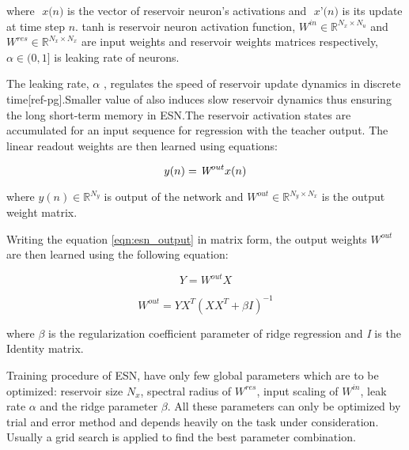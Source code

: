 where $\textit{ x(n)}$ is the vector of reservoir neuron's activations and $\textit{ x'(n)}$ is its update at time step $\textit{n}$. tanh is reservoir neuron activation function, $ W^{in} \in \mathbb{R}^{{N_x} \times{N_u}}$ and $ W^{res} \in \mathbb{R}^{{N_x} \times{N_x}} $ are input weights and reservoir weights matrices respectively, $\alpha \in (0,1]$ is leaking rate of neurons.  

The leaking rate, $\alpha$ , regulates the speed of reservoir update dynamics in discrete time[ref-pg].Smaller value of also induces slow reservoir dynamics thus ensuring the long short-term memory in ESN.The reservoir activation states are accumulated for an input sequence for regression with the teacher output. The linear readout weights are then learned using equations:

\begin{equation}\label{eqn:esn_output}
y(n)=\textit W^{out}x(n)
\end{equation}

where $y(n) \in \mathbb{R}^{N_y}$ is output of the network and $W^{out} \in \mathbb{R}^{{N_y} \times {N_x}}$ is the output weight matrix.

Writing the equation \ref{eqn:esn_output} in matrix form, the output weights $W^{out}$ are then learned using the following equation:
 
\begin{equation}
Y=W^{out}X
\end{equation}

\begin{equation}
W^{out}=YX^{T}(XX^{T}+{\beta}I)^{-1}
\end{equation}

where $\beta$ is the regularization coefficient parameter of ridge regression and \textit{I} is the Identity matrix. 

Training procedure of ESN, have only few global parameters which are to be optimized: reservoir size $ N_{x} $, spectral radius of $W^{res}$, input scaling of $W^{in}$, leak rate $\alpha$ and the ridge parameter $\beta$. All these parameters can only be optimized by trial and error method and depends heavily on the task under consideration. Usually a grid search is applied to find the best parameter combination.   
